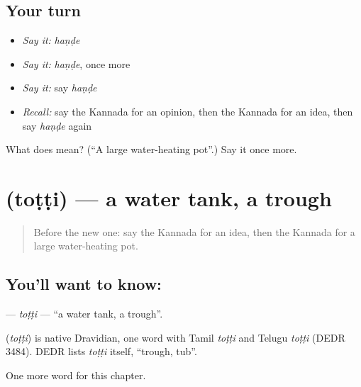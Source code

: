 \subsection*{Your turn}
\begin{itemize}
\raggedright
  \item \emph{Say it:} \emph{haṇḍe}
  \item \emph{Say it:} \emph{haṇḍe}, once more
  \item \emph{Say it:} say \emph{haṇḍe}
  \item \emph{Recall:} say the Kannada for an opinion, then the Kannada for an idea, then say \emph{haṇḍe} again
\end{itemize}

\begin{tcolorbox}[breakable,colback=teal!4,colframe=teal!35!black,title={Before you move on}]
What does  mean? (\textquotedblleft{}A large water-heating pot\textquotedblright{}.) Say it once more.
\end{tcolorbox}
\section[\texorpdfstring{\kn{ತೊಟ್ಟಿ} (toṭṭi)}{ತೊಟ್ಟಿ (toṭṭi)}]{ (toṭṭi) — a water tank, a trough}

\label{lesson:KA-C229-totti}



\begin{quote}
Before the new one: say the Kannada for an idea, then the Kannada for a large water-heating pot.
\end{quote}

\subsection*{You'll want to know: }
\textbf{} — \emph{toṭṭi} — \textquotedblleft{}a water tank, a trough\textquotedblright{}.

\begin{cousinweb}
\textbf{} (\emph{toṭṭi}) is native Dravidian, one word with Tamil \emph{toṭṭi} and Telugu \emph{toṭṭi} (DEDR 3484). DEDR lists \emph{toṭṭi} itself, \textquotedblleft{}trough, tub\textquotedblright{}.
\end{cousinweb}

\begin{grammarlens}[title={What you've built}]
One more word for this chapter.
\end{grammarlens}

